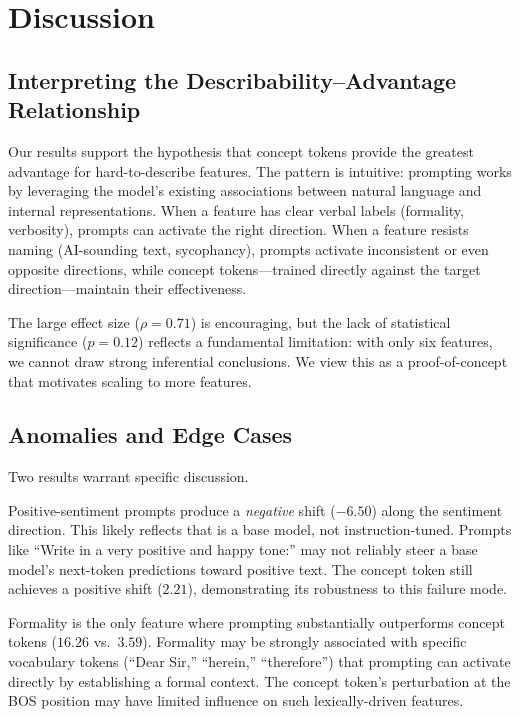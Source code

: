 \section{Discussion}
\label{sec:discussion}

\subsection{Interpreting the Describability--Advantage Relationship}

Our results support the hypothesis that concept tokens provide the greatest advantage for hard-to-describe features. The pattern is intuitive: prompting works by leveraging the model's existing associations between natural language and internal representations. When a feature has clear verbal labels (formality, verbosity), prompts can activate the right direction. When a feature resists naming (AI-sounding text, sycophancy), prompts activate inconsistent or even opposite directions, while concept tokens---trained directly against the target direction---maintain their effectiveness.

The large effect size ($\rho = 0.71$) is encouraging, but the lack of statistical significance ($p = 0.12$) reflects a fundamental limitation: with only six features, we cannot draw strong inferential conclusions. We view this as a proof-of-concept that motivates scaling to more features.

\subsection{Anomalies and Edge Cases}

Two results warrant specific discussion.

Positive-sentiment prompts produce a \emph{negative} shift ($-6.50$) along the sentiment direction. This likely reflects that \pythia is a base model, not instruction-tuned. Prompts like ``Write in a very positive and happy tone:'' may not reliably steer a base model's next-token predictions toward positive text. The concept token still achieves a positive shift ($2.21$), demonstrating its robustness to this failure mode.

Formality is the only feature where prompting substantially outperforms concept tokens ($16.26$ vs.\ $3.59$). Formality may be strongly associated with specific vocabulary tokens (``Dear Sir,'' ``herein,'' ``therefore'') that prompting can activate directly by establishing a formal context. The concept token's perturbation at the BOS position may have limited influence on such lexically-driven features.

